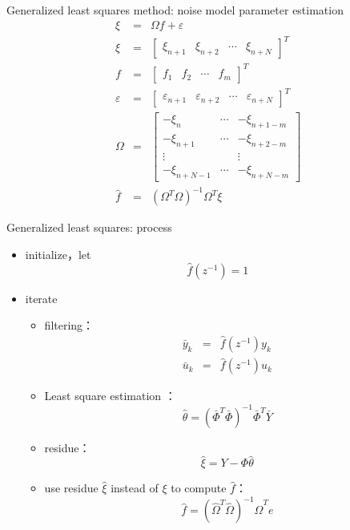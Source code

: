 \begin{frame}{ Generalized least squares method: noise model parameter estimation }
\begin{eqnarray*}
\xi &=&\Omega f + \varepsilon \\
\xi &=& \begin{bmatrix}\xi_{n+1} & \xi_{n+2} & \cdots & \xi_{n+N}\end{bmatrix}^T \\
f &=& \begin{bmatrix}f_1 & f_2 & \cdots & f_m\end{bmatrix}^T \\
\varepsilon &=& \begin{bmatrix}\varepsilon_{n+1} & \varepsilon_{n+2} &\cdots& \varepsilon_{n+N}\end{bmatrix}^T \\
\Omega &=& \begin{bmatrix}
-\xi_n & \cdots & -\xi_{n+1-m} \\
-\xi_{n+1} & \cdots & -\xi_{n+2-m} \\
\vdots &        &\vdots \\
-\xi_{n+N-1} & \cdots & -\xi_{n+N-m} 
\end{bmatrix} \\
\hat f &=& (\Omega^T\Omega)^{-1}\Omega^T\xi
\end{eqnarray*}
\end{frame}

\begin{frame}{ Generalized least squares: process }
\begin{itemize}
\item initialize，let $$\hat f(z^{-1}) =1$$
\item iterate
\begin{itemize}
\item filtering：
\begin{eqnarray*}
\bar y_k &=& \hat f(z^{-1}) y_k \\
\bar u_k &=& \hat f(z^{-1}) u_k
\end{eqnarray*}
\item  Least square estimation ：$$\hat\theta = (\bar\Phi^T\bar\Phi)^{-1}\bar\Phi^T \bar Y  $$
\item residue：$$\hat\xi = Y-\Phi\hat\theta  $$
\item use residue $\hat\xi$ instead of  $\xi$ to compute $\hat f$：$$\hat f = (\hat\Omega^T\hat\Omega)^{-1}\hat\Omega^T e $$
\end{itemize}
\end{itemize}
\end{frame}

